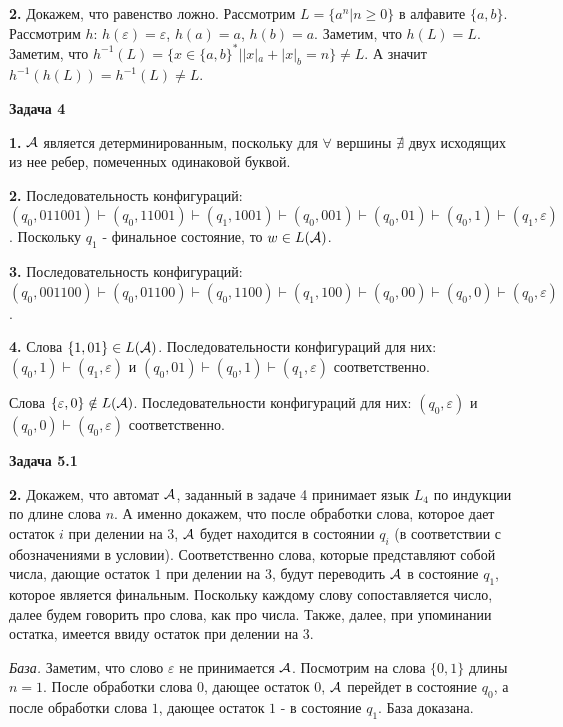 \documentclass[10pt]{article}
\let\eps\varepsilon
\begin{document}
{\bf 2.}
Докажем, что равенство ложно. Рассмотрим $L = \{ a^n | n \geq 0 \}$ в алфавите $\{ a, b \}$. Рассмотрим $h$: $h(\eps) = \eps$, $h(a) = a$, $h(b) = a$. Заметим, что $h(L) = L$. Заметим, что $h^{-1}(L) = \{ x \in \{ a, b \}^* | |x|_a + |x|_b = n \} \neq L$. А значит $h^{-1}(h(L)) = h^{-1}(L) \neq L$.

\medskip

{\bf Задача 4}

{\bf 1.}
${\cal A}$ является детерминированным, поскольку для $\forall$ вершины $\nexists$ двух исходящих из нее ребер, помеченных одинаковой буквой.

{\bf 2.}
Последовательность конфигураций: $(q_0, 011001) \vdash (q_0, 11001) \vdash (q_1, 1001) \vdash (q_0, 001) \vdash (q_0, 01) \vdash (q_0, 1) \vdash (q_1, \eps)$. Поскольку $q_1$ - финальное состояние, то $w\in L({\cal A})$.

{\bf 3.}
Последовательность конфигураций: $(q_0, 001100) \vdash (q_0, 01100) \vdash (q_0, 1100) \vdash (q_1, 100) \vdash (q_0, 00) \vdash (q_0, 0) \vdash (q_0, \eps)$.

{\bf 4.}
Слова $\{ 1, 01 \} \in L({\cal A})$. Последовательности конфигураций для них: $(q_0, 1) \vdash (q_1, \eps)$ и $(q_0, 01) \vdash (q_0, 1) \vdash (q_1, \eps)$ соответственно.

Слова $\{ \eps, 0 \} \notin L({\cal A})$. Последовательности конфигураций для них: $(q_0, \eps)$ и $(q_0, 0) \vdash (q_0, \eps)$ соответственно.

\medskip

{\bf Задача 5.1}

{\bf 2.}
Докажем, что автомат ${\cal A}$, заданный в задаче 4 принимает язык $L_4$ по индукции по длине слова $n$. А именно докажем, что после обработки слова, которое дает остаток $i$ при делении на $3$, ${\cal A}$ будет находится в состоянии $q_i$ (в соответствии с обозначениями в условии). Соответственно слова, которые представляют собой числа, дающие остаток $1$ при делении на $3$, будут переводить ${\cal A}$ в состояние $q_1$, которое является финальным. Поскольку каждому слову сопоставляется число, далее будем говорить про слова, как про числа. Также, далее, при упоминании остатка, имеется ввиду остаток при делении на $3$.

{\em База.}
Заметим, что слово $\eps$ не принимается ${\cal A}$. Посмотрим на слова $\{ 0, 1 \}$ длины $n = 1$. После обработки слова $0$, дающее остаток 0, ${\cal A}$ перейдет в состояние $q_0$, а после обработки слова $1$, дающее остаток $1$ - в состояние $q_1$. База доказана.
\end{document}
